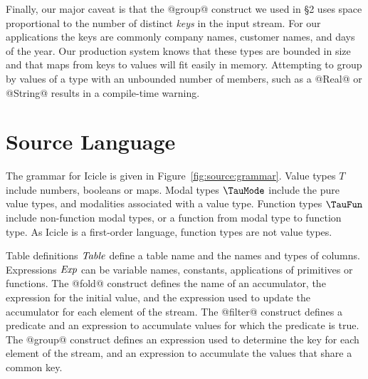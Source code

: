 Finally, our major caveat is that the @group@ construct we used in \S2 uses space proportional to the number of distinct \emph{keys} in the input stream.
For our applications the keys are commonly company names, customer names, and days of the year.
Our production system knows that these types are bounded in size and that maps from keys to values will fit easily in memory.
Attempting to group by values of a type with an unbounded number of members, such as a @Real@ or @String@ results in a compile-time warning.




\eject
\section{Source Language}
\label{s:IcicleSource}





The grammar for Icicle is given in Figure~\ref{fig:source:grammar}.
Value types $T$ include numbers, booleans or maps.
Modal types $\TauMode$ include the pure value types, and modalities associated with a value type.
Function types $\TauFun$ include non-function modal types, or a function from modal type to function type.
As Icicle is a first-order language, function types are not value types.

Table definitions $\mathit{Table}$ define a table name and the names and types of columns.
Expressions $\mathit{Exp}$ can be variable names, constants, applications of primitives or functions.
The @fold@ construct defines the name of an accumulator, the expression for the initial value, and the expression used to update the accumulator for each element of the stream.
The @filter@ construct defines a predicate and an expression to accumulate values for which the predicate is true.
The @group@ construct defines an expression used to determine the key for each element of the stream, and an expression to accumulate the values that share a common key.

